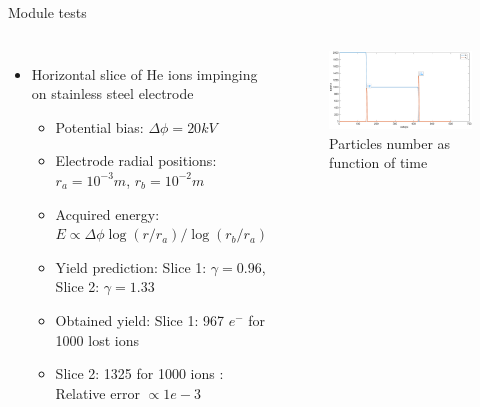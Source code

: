 \documentclass[aspectratio=169,xcolor=dvipsnames,8pt]{beamer}
\begin{document}
  \begin{frame}{Module tests}
     \begin{columns}[c] %

	\begin{itemize}


		\item{Horizontal slice of He ions impinging on stainless steel electrode\\
			\begin{itemize}
		
				\item{Potential bias: $\Delta\phi = 20kV$}
				\item{Electrode radial positions: $r_a = 10^{-3}m$, $r_b = 10^{-2}m$ }
				\item{Acquired energy: $E\propto \Delta \phi \log(r/r_a)/\log(r_b/r_a)$} 
				\item{Yield prediction: Slice 1: $\gamma =0.96$, Slice 2: $\gamma = 1.33$}
				\item{Obtained yield: Slice 1: 967 $e^{-}$ for 1000 lost ions}
				\item{Slice 2: 1325 for 1000 ions : Relative error $\propto 1e-3$}
				\end{itemize}}
				
						
	\end{itemize}

		\begin{figure}[h!]
		\includegraphics[width=1 \textwidth]{flatslice.eps}
		\caption{\label{img1} Particles number as function of time}
		\end{figure}
     \end{columns}
\end{frame}




\end{document}
